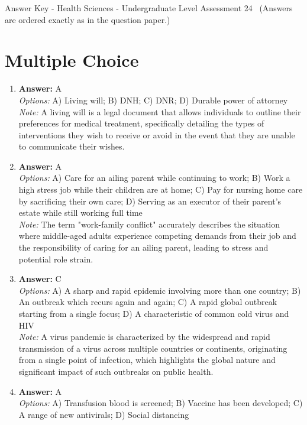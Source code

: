 \documentclass[12pt]{article}
\begin{document}
\begin{center}
Answer Key - Health Sciences - Undergraduate Level Assessment 24 \
\small (Answers are ordered exactly as in the question paper.)
\end{center}

\section*{Multiple Choice}
\begin{enumerate}[label=\arabic*.]
\item \textbf{Answer:} A
\\ \textit{Options:} A) Living will; B) DNH; C) DNR; D) Durable power of attorney
\\ \textit{Note:} A living will is a legal document that allows individuals to outline their preferences for medical treatment, specifically detailing the types of interventions they wish to receive or avoid in the event that they are unable to communicate their wishes.
\item \textbf{Answer:} A
\\ \textit{Options:} A) Care for an ailing parent while continuing to work; B) Work a high stress job while their children are at home; C) Pay for nursing home care by sacrificing their own care; D) Serving as an executor of their parent's estate while still working full time
\\ \textit{Note:} The term "work-family conflict" accurately describes the situation where middle-aged adults experience competing demands from their job and the responsibility of caring for an ailing parent, leading to stress and potential role strain.
\item \textbf{Answer:} C
\\ \textit{Options:} A) A sharp and rapid epidemic involving more than one country; B) An outbreak which recurs again and again; C) A rapid global outbreak starting from a single focus; D) A characteristic of common cold virus and HIV
\\ \textit{Note:} A virus pandemic is characterized by the widespread and rapid transmission of a virus across multiple countries or continents, originating from a single point of infection, which highlights the global nature and significant impact of such outbreaks on public health.
\item \textbf{Answer:} A
\\ \textit{Options:} A) Transfusion blood is screened; B) Vaccine has been developed; C) A range of new antivirals; D) Social distancing

\end{enumerate}
\end{document}
